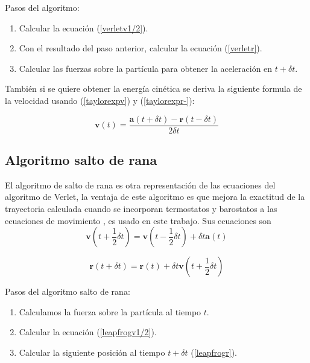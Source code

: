 Pasos del algoritmo:

\begin{enumerate}
    \item Calcular la ecuación (\ref{verletv1/2}).
    \item Con el resultado del paso anterior, calcular la ecuación (\ref{verletr}).
    \item Calcular las fuerzas sobre la partícula para obtener la aceleración en $t + \delta t$.
\end{enumerate}

También si se quiere obtener la energía cinética se deriva la siguiente formula de la velocidad usando (\ref{taylorexpv}) y (\ref{taylorexpr-}):

\begin{equation}
    \mathbf{v}(t)=\frac{\mathbf{a}(t + \delta t)-\mathbf{r}(t - \delta t)}{2\delta t}
\end{equation}

\subsection{Algoritmo salto de rana}

El algoritmo de salto de rana es otra representación de las ecuaciones del algoritmo de Verlet, la ventaja de este algoritmo es que mejora la exactitud de la trayectoria calculada cuando se incorporan termostatos y barostatos a las ecuaciones de movimiento \cite{gromacsdoc}\cite{Allen2017}, es usado en este trabajo. Sus ecuaciones son\\

\begin{equation} \label{leapfrogv1/2}
    \mathbf{v}(t + \frac{1}{2}\delta t)=\mathbf{v}(t - \frac{1}{2}\delta t)+\delta t\mathbf{a}(t)
\end{equation}

\begin{equation} \label{leapfrogr}
    \mathbf{r}(t + \delta t)= \mathbf{r}(t)+\delta t \mathbf{v}(t+\frac{1}{2}\delta t)
\end{equation}

Pasos del algoritmo salto de rana:

\begin{enumerate}
    \item Calculamos la fuerza sobre la partícula al tiempo $t$.
    \item Calcular la ecuación (\ref{leapfrogv1/2}).
    \item Calcular la siguiente posición al tiempo $t+\delta t$ (\ref{leapfrogr}).
\end{enumerate}

